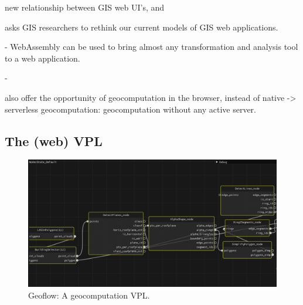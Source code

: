new relationship between GIS web UI's, and 


asks \ac{GIS} researchers to rethink our current models of GIS web applications. 

- WebAssembly can be used to bring almost any transformation and analysis tool to a web application. 



- 


also offer the opportunity of geocomputation in the browser, instead of native
  -> serverless geocomputation: geocomputation without any active server. 




\subsection*{The (web) VPL}

\begin{figure}
  \centering
  \graphicspath{{../../assets/images/background/geo-vpl/}}
  \includegraphics[width=\linewidth]{geoflow.png}
  \caption{Geoflow: A geocomputation VPL. \citep{peters_geoflow_2019}}
  \label{fig:1:geoflow}
\end{figure}








